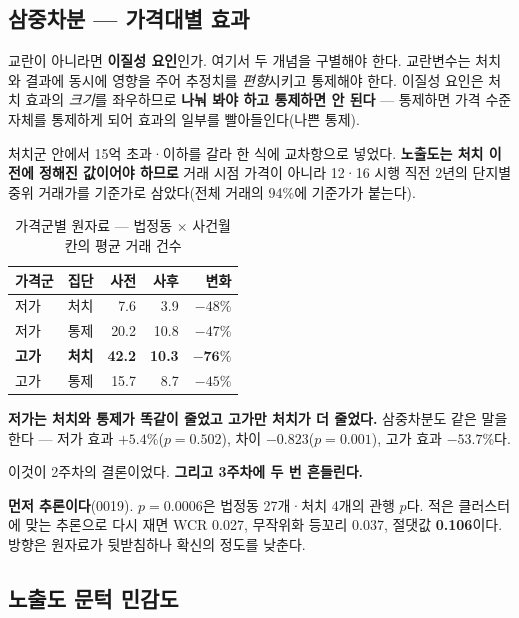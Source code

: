 \subsection{삼중차분 --- 가격대별 효과}

교란이 아니라면 \textbf{이질성 요인}인가. 여기서 두 개념을 구별해야 한다.
교란변수는 처치와 결과에 동시에 영향을 주어 추정치를 \emph{편향}시키고 통제해야
한다. 이질성 요인은 처치 효과의 \emph{크기}를 좌우하므로 \textbf{나눠 봐야 하고
통제하면 안 된다} --- 통제하면 가격 수준 자체를 통제하게 되어 효과의 일부를
빨아들인다(나쁜 통제).

처치군 안에서 15억 초과·이하를 갈라 한 식에 교차항으로 넣었다. \textbf{노출도는
처치 이전에 정해진 값이어야 하므로} 거래 시점 가격이 아니라 12·16 시행 직전 2년의
단지별 중위 거래가를 기준가로 삼았다(전체 거래의 94\%에 기준가가 붙는다).

\begin{table}[htbp]
  \centering
  \caption{가격군별 원자료 --- 법정동 $\times$ 사건월 칸의 평균 거래 건수}
  \label{tab:loan-raw}
  \begin{tabular}{llrrr}
    \toprule
    \textbf{가격군} & \textbf{집단} & \textbf{사전} & \textbf{사후} &
    \textbf{변화} \\
    \midrule
    저가 & 처치 & 7.6 & 3.9 & $-48\%$ \\
    저가 & 통제 & 20.2 & 10.8 & $-47\%$ \\
    \textbf{고가} & \textbf{처치} & \textbf{42.2} & \textbf{10.3} &
      $\mathbf{-76\%}$ \\
    고가 & 통제 & 15.7 & 8.7 & $-45\%$ \\
    \bottomrule
  \end{tabular}
\end{table}

\textbf{저가는 처치와 통제가 똑같이 줄었고 고가만 처치가 더 줄었다.} 삼중차분도
같은 말을 한다 --- 저가 효과 $+5.4\%$($p=0.502$), 차이 $-0.823$($p=0.001$), 고가
효과 $-53.7\%$다.

이것이 2주차의 결론이었다. \textbf{그리고 3주차에 두 번 흔들린다.}

\textbf{먼저 추론이다}(0019). $p=0.0006$은 법정동 27개·처치 4개의 관행 $p$다.
적은 클러스터에 맞는 추론으로 다시 재면 WCR 0.027, 무작위화 등꼬리 0.037,
절댓값 \textbf{0.106}이다. 방향은 원자료가 뒷받침하나 확신의 정도를 낮춘다.

\subsection{노출도 문턱 민감도}

